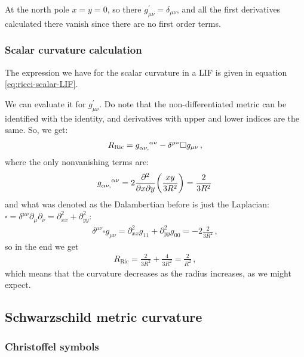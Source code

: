 \documentclass[main.tex]{subfiles}
\begin{document}
At the north pole \(x=y=0\), so there \(g^{\prime }_{\mu \nu }= \delta_{\mu \nu }\), and all the first derivatives calculated there vanish since there are no first order terms.

\subsubsection{Scalar curvature calculation}

The expression we have for the scalar curvature in a LIF is given in equation \eqref{eq:ricci-scalar-LIF}.

We can evaluate it for \(g_{\mu \nu }^{\prime }\). Do note  that the non-differentiated metric can be identified with the identity, and derivatives with upper and lower indices are the same. So, we get:
%
\begin{align}
  R _{\text{Ric}} = \tensor{g}{_{\alpha \nu , }^{\alpha \nu }} - \delta^{\mu \nu } \square g_{\mu \nu }
\,,
\end{align}
%
where the only nonvanishing terms are: 
%
\begin{align}
  \tensor{g}{_{\alpha \nu,}^{\alpha \nu }} = 2 \pdv[2]{}{x}{y} \qty(\frac{xy}{3R^2}) = \frac{2}{3R^2}
\,
\end{align}
%
and what was denoted as the Dalambertian before is just the Laplacian: \(\square = \delta^{\mu \nu }\partial_{\mu } \partial_{\nu }= \partial^2_{xx} + \partial^2_{yy}\):
%
\begin{align}
  \delta^{\mu \nu } \square g_{\mu \nu }
  = \partial_{xx}^2 g_{11} + \partial_{yy}^2 g_{00}
  = - 2 \frac{2}{3R^2} 
\,,
\end{align}
%
so in the end we get 
%
\begin{align}
  R _{\text{Ric}} = \frac{2}{3R^2} + \frac{4}{3R^2} = \frac{2}{R^2}
\,,
\end{align}
%
which means that the curvature decreases as the radius increases, as we might expect.

\subsection{Schwarzschild metric curvature}

\subsubsection{Christoffel symbols}
\end{document}
